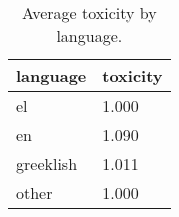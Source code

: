 \begin{table}
\caption{Average toxicity by language.}
\label{tab::toxic_lang}
\begin{tabular}{|p{3.5cm}|p{1cm}|}
\toprule
language & toxicity \\
\midrule
el & 1.000 \\
en & 1.090 \\
greeklish & 1.011 \\
other & 1.000 \\
\bottomrule
\end{tabular}
\end{table}
